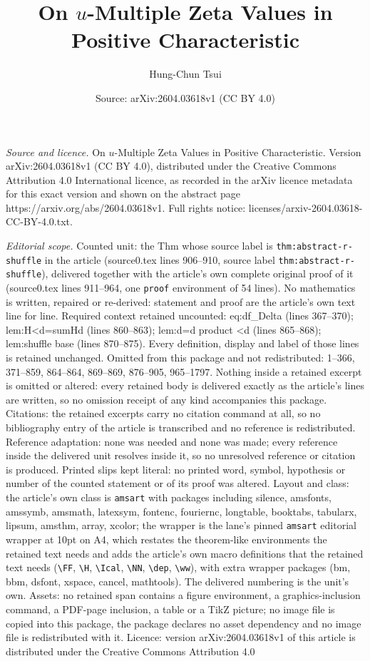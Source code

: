 \documentclass[10pt,a4paper]{amsart}
\title[On $u$-Multiple Zeta Values in Positive Characteristic]{On $u$-Multiple Zeta Values in Positive Characteristic}
\author{Hung-Chun Tsui}
\date{Source: arXiv:2604.03618v1 (CC BY 4.0)}
\begin{document}
\maketitle

\noindent\emph{Source and licence.} On $u$-Multiple Zeta Values in Positive Characteristic. Version arXiv:2604.03618v1 (CC BY 4.0), distributed under the Creative Commons Attribution 4.0 International licence, as recorded in the arXiv licence metadata for this exact version and shown on the abstract page https://arxiv.org/abs/2604.03618v1. Full rights notice: licenses/arxiv-2604.03618-CC-BY-4.0.txt.\par\smallskip

\noindent\textit{Editorial scope.} Counted unit: the Thm whose source label is \texttt{thm:abstract-r-shuffle} in the article (source0.tex lines 906--910, source label \texttt{thm:abstract-r-shuffle}), delivered together with the article's own complete original proof of it (source0.tex lines 911--964, one \texttt{proof} environment of 54 lines). No mathematics is written, repaired or re-derived: statement and proof are the article's own text line for line. Required context retained uncounted: eq:df\_Delta (lines 367--370); lem:H<d=sumHd (lines 860--863); lem:d=d product <d (lines 865--868); lem:shuffle base (lines 870--875). Every definition, display and label of those lines is retained unchanged. Omitted from this package and not redistributed: 1--366, 371--859, 864--864, 869--869, 876--905, 965--1797. Nothing inside a retained excerpt is omitted or altered: every retained body is delivered exactly as the article's lines are written, so no omission receipt of any kind accompanies this package. Citations: the retained excerpts carry no citation command at all, so no bibliography entry of the article is transcribed and no reference is redistributed. Reference adaptation: none was needed and none was made; every reference inside the delivered unit resolves inside it, so no unresolved reference or citation is produced. Printed slips kept literal: no printed word, symbol, hypothesis or number of the counted statement or of its proof was altered. Layout and class: the article's own class is \texttt{amsart} with packages including silence, amsfonts, amssymb, amsmath, latexsym, fontenc, fouriernc, longtable, booktabs, tabularx, lipsum, amsthm, array, xcolor; the wrapper is the lane's pinned \texttt{amsart} editorial wrapper at 10pt on A4, which restates the theorem-like environments the retained text needs and adds the article's own macro definitions that the retained text needs (\texttt{\textbackslash FF}, \texttt{\textbackslash H}, \texttt{\textbackslash Ical}, \texttt{\textbackslash NN}, \texttt{\textbackslash dep}, \texttt{\textbackslash ww}), with extra wrapper packages (bm, bbm, dsfont, xspace, cancel, mathtools). The delivered numbering is the unit's own. Assets: no retained span contains a figure environment, a graphics-inclusion command, a PDF-page inclusion, a table or a TikZ picture; no image file is copied into this package, the package declares no asset dependency and no image file is redistributed with it. Licence: version arXiv:2604.03618v1 of this article is distributed under the Creative Commons Attribution 4.0 
\end{document}

